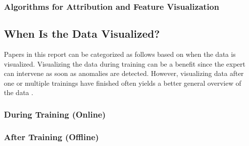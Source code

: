 \documentclass{acmsiggraph}               %
\begin{document}
\subsubsection{Algorithms for Attribution and Feature Visualization}

\subsection{When Is the Data Visualized?}
Papers in this report can be categorized as follows based on when the data is visualized. Visualizing the data during training can be a benefit since the expert can intervene as soon as anomalies are detected. However, visualizing data after one or multiple trainings have finished often yields a better general overview of the data \cite{Hohman2018}.
\subsubsection{During Training (Online)}
\subsubsection{After Training (Offline)}


\nocite{*}

\end{document}
